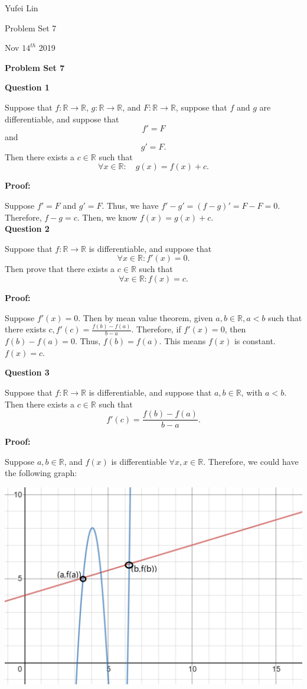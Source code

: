 \documentclass[a4paper,12pt]{report}
\newcommand{\R}{\mathbb{R}}
\begin{document}
\noindent
Yufei Lin

\noindent
Problem Set 7

\noindent
Nov \(14^{th}\) 2019

\begin{center}
\textbf{Problem Set 7}
\end{center}

\noindent
\textbf{Question 1}

\noindent
Suppose that $f:\R\to\R$,
$g:\R\to\R$, and $F:\R\to\R$, suppose that $f$
and $g$ are differentiable, and suppose
that
\[
f'=F
\]
and 
\[
g'=F.
\]
Then there exists a $c\in\R$ such that
\[
\forall x\in\R:\quad g(x)=f(x)+c.
\]

\noindent
\textbf{Proof: }

\noindent
Suppose $f'=F$ and $g'=F$. Thus, we have $f'-g'=(f-g)'=F-F=0$. Therefore, $f-g=c$. Then, we know $f(x)=g(x)+c$.\\

\noindent
\textbf{Question 2}

\noindent
Suppose that $f:\R\to\R$ is
differentiable, and suppose that
\[
\forall x\in\R: f'(x)=0.
\]
Then prove that there exists a $c\in\R$ such that
\[
\forall x\in\R: f(x)=c.
\]

\noindent
\textbf{Proof: }

\noindent
Suppose $f'(x)=0$. Then by mean value theorem, given $a,b \in \mathbb{R}, a<b$ such that there exists $c, f'(c)=\frac{f(b)-f(a)}{b-a}$. Therefore, if $f'(x)=0$, then $f(b)-f(a)=0$.  Thus, $f(b)=f(a)$. This means $f(x)$ is constant. $f(x)=c$. 

\pagebreak
\noindent
\textbf{Question 3}

\noindent
Suppose that $f:\R\to\R$ is
differentiable, and suppose that $a,b\in\R$, 
with $a<b$. Then there exists a $c\in\R$
such that
\[
f'(c)=\frac{f(b)-f(a)}{b-a}.
\]

\noindent
\textbf{Proof: }

\noindent
Suppose $a,b\in \mathbb{R}$, and $f(x)$ is differentiable $\forall x, x\in \mathbb{R}$. Therefore, we could have the following graph:

\includegraphics{Question3.png}
\end{document}
